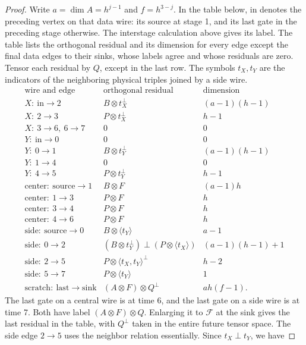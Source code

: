 \documentclass[11pt]{article}
\theoremstyle{definition}
\begin{document}
\begin{proof}
Write $a=\dim A=h^{j-1}$ and $f=h^{3-j}$.  In the table below,
$\mathrm{in}$ denotes the preceding vertex on that data wire: its source
at stage 1, and its last gate in the preceding stage otherwise.  The
interstage calculation above gives its label.  The table lists the
orthogonal residual and its dimension for every edge except the final
data edges to their sinks, whose labels agree and whose residuals are zero.
Tensor each residual by $Q$, except in the last row.  The symbols $t_X,t_Y$ are
the indicators of the neighboring physical triples joined by a side wire.
\[
\begin{array}{l|l|r}
\text{wire and edge}&\text{orthogonal residual}&\text{dimension}\\ \hline
X:\ \mathrm{in}\to2&B\otimes t_X^\perp&(a-1)(h-1)\\
X:\ 2\to3&P\otimes t_X^\perp&h-1\\
X:\ 3\to6,\ 6\to7&0&0\\
Y:\ \mathrm{in}\to0&0&0\\
Y:\ 0\to1&B\otimes t_Y^\perp&(a-1)(h-1)\\
Y:\ 1\to4&0&0\\
Y:\ 4\to5&P\otimes t_Y^\perp&h-1\\
\mathrm{center}:\ \mathrm{source}\to1&B\otimes F&(a-1)h\\
\mathrm{center}:\ 1\to3&P\otimes F&h\\
\mathrm{center}:\ 3\to4&P\otimes F&h\\
\mathrm{center}:\ 4\to6&P\otimes F&h\\
\mathrm{side}:\ \mathrm{source}\to0&B\otimes\langle t_Y\rangle&a-1\\
\mathrm{side}:\ 0\to2&(B\otimes t_Y^\perp)\mathbin{\perp}(P\otimes\langle t_X\rangle)
 &(a-1)(h-1)+1\\
\mathrm{side}:\ 2\to5&P\otimes\langle t_X,t_Y\rangle^\perp&h-2\\
\mathrm{side}:\ 5\to7&P\otimes\langle t_Y\rangle&1\\
\mathrm{scratch}:\ \mathrm{last}\to\mathrm{sink}
 &(A\otimes F)\otimes Q^\perp&ah(f-1).
\end{array}
\]
The last gate on a central wire is at time 6, and the last gate on a side
wire is at time 7.  Both have label $(A\otimes F)\otimes Q$.  Enlarging it
to $\mathcal F$ at the sink gives the last residual in the table, with
$Q^\perp$ taken in the entire future tensor space.
The side edge $2\to5$ uses the neighbor relation
essentially.  Since $t_X\perp t_Y$, we have

\end{proof}
\end{document}
